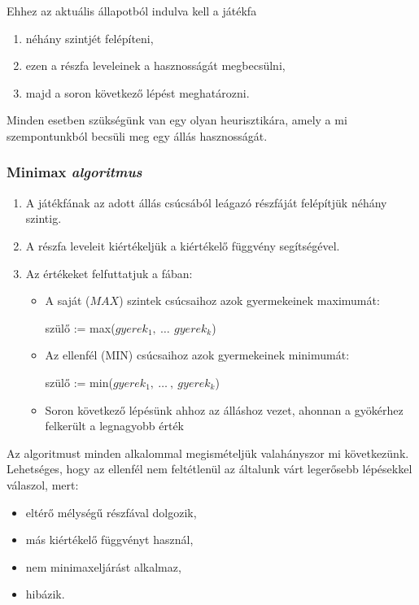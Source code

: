 \documentclass[12pt,margin=0px]{article}
\begin{document}
{    \noindent Ehhez az aktuális állapotból indulva kell a játékfa
    \begin{enumerate}
        \item néhány szintjét felépíteni,
        \item ezen a részfa leveleinek a hasznosságát megbecsülni,
        \item majd a soron következő lépést meghatározni.
    \end{enumerate}
    Minden esetben szükségünk van egy olyan heurisztikára, amely a mi szempontunkból becsüli meg egy állás hasznosságát.\\

    \subsubsection*{Minimax \emph{algoritmus}}

    \begin{enumerate}
        \item A játékfának az adott állás csúcsából leágazó részfáját felépítjük néhány szintig.
        \item A részfa leveleit kiértékeljük a kiértékelő függvény segítségével.
        \item Az értékeket felfuttatjuk a fában:
        \begin{itemize}
            \item A saját ($MAX$) szintek csúcsaihoz azok gyermekeinek maximumát:
            \begin{center}
                szülő := max\Big($gyerek_1,\ \ldots \,\ gyerek_k$\Big)
            \end{center}
            \item Az ellenfél (MIN) csúcsaihoz azok gyermekeinek minimumát:
            \begin{center}
                szülő := min\Big($gyerek_1,\ \ldots\ ,\ gyerek_k$\Big)
            \end{center}
            \item Soron következő lépésünk ahhoz az álláshoz vezet, ahonnan a gyökérhez felkerült a legnagyobb érték
        \end{itemize}
    \end{enumerate}
    
   \newpage
        {\color{mygray}
   \noindent Az algoritmust minden alkalommal megismételjük valahányszor mi következünk. Lehetséges, hogy az ellenfél nem feltétlenül az általunk várt legerősebb lépésekkel válaszol, mert:
        \begin{itemize}
          \item eltérő mélységű részfával dolgozik,
          \item más kiértékelő függvényt használ,
          \item nem minimaxeljárást alkalmaz,
          \item hibázik.\\
        \end{itemize}
        }
	
}
\end{document}
